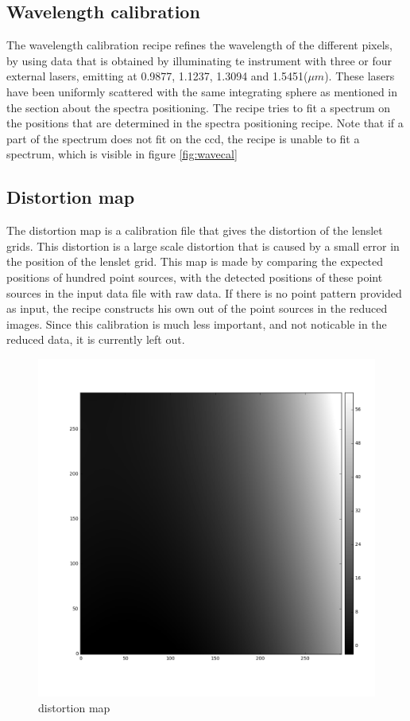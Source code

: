 \documentclass[twoside,single]{lion-msc}
\begin{document}
\subsection{Wavelength calibration}
The wavelength calibration recipe refines the wavelength of the different pixels, by using data that is obtained by illuminating te instrument with three or four external lasers, emitting at 0.9877, 1.1237, 1.3094 and 1.5451($\mu m$). These lasers have been uniformly scattered with the same integrating sphere as mentioned in the section about the spectra positioning. The recipe tries to fit a spectrum on the positions that are determined in the spectra positioning recipe. Note that if a part of the spectrum does not fit on the ccd, the recipe is unable to fit a spectrum, which is visible in figure \ref{fig:wavecal}


\subsection{Distortion map}
The distortion map is a calibration file that gives the distortion of the lenslet grids. This distortion is a large scale distortion that is caused by a small error in the position of the lenslet grid. This map is made by comparing the expected positions of hundred point sources, with the detected positions of these point sources in the input data file with raw data. If there is no point pattern provided as input, the recipe constructs his own out of the point sources in the reduced images. Since this calibration is much less important, and not noticable in the reduced data, it is currently left out.

\begin{figure}
\centering
\includegraphics[width=0.5\linewidth]{distortmap}
\caption{distortion map}
\label{fig:specpos}
\end{figure}
\end{document}
